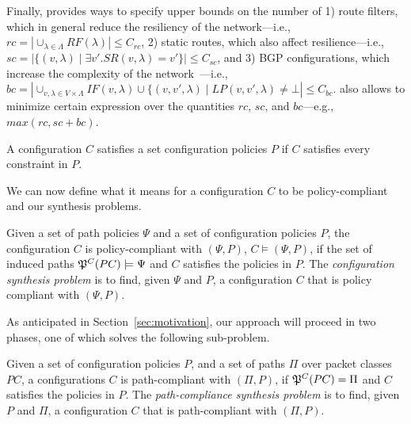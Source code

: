 Finally, \name provides ways to specify upper bounds on the number of
1) route filters, which in general reduce the resiliency of the network---i.e., $rc=|\cup_{\lambda\in \Lambda} RF(\lambda)|\leq C_{rc}$,
2) static routes, which also affect resilience---i.e., $sc=|\{(v,\lambda)\mid \exists v'. SR(v,\lambda)=v'\}|\leq C_{sc}$, and
3) BGP configurations, which increase the complexity of the network~\cite{batfish, arc, era}---i.e., 
$bc=|\cup_{v,\lambda\in V\times\Lambda} IF(v,\lambda)\cup \{(v,v',\lambda)\mid LP(v,v',\lambda)\neq \bot|\leq C_{bc}$.
\name also allows to minimize certain expression over the quantities $rc$, $sc$, and $bc$---e.g., $max(rc, sc+bc)$.


A configuration $C$ satisfies a set configuration policies $P$
if $C$ satisfies every constraint in $P$.

\noindent We can now define what it means for a configuration $C$ to be policy-compliant
and our synthesis problems.
\begin{definition}
	Given a set of path policies $\Psi$ and a set of configuration policies $P$,
	the configuration $C$ is policy-compliant with $(\Psi,P)$,
	$C \models (\Psi,P)$, if the set of
	induced paths $\mathfrak{P}^C(PC) \models \Psi$
	and $C$ satisfies the policies in $P$.
	The \emph{configuration synthesis problem} is to find, given $\Psi$ and $P$,
a configuration $C$ that is policy compliant with $(\Psi,P)$.
\end{definition}



As anticipated in Section~\ref{sec:motivation}, our approach will proceed in two phases,
one of which solves the following sub-problem.  
\begin{definition}
Given a set of configuration policies $P$,
and a set of paths $\Pi$ over packet classes $PC$,
	a configurations $C$ is path-compliant with 
	$(\Pi,P)$,
	if $\mathfrak{P}^C(PC)=\Pi$ and $C$ satisfies the policies in $P$.
	The \emph{path-compliance synthesis problem} is to find, given $P$ and $\Pi$,
a configuration $C$ that is path-compliant with $(\Pi,P)$.
\end{definition}




